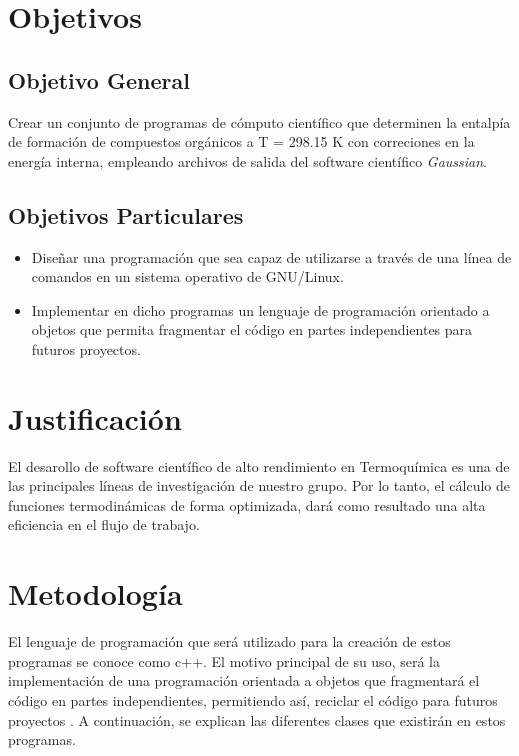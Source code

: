 \documentclass[12pt]{article}
\begin{document}
\section*{Objetivos}

\subsection*{Objetivo General}

Crear un conjunto de programas de cómputo científico que determinen la entalpía de formación de compuestos orgánicos a T = 298.15 K con correciones en la energía interna, empleando archivos de salida del software científico \textit{Gaussian}.

\subsection*{Objetivos Particulares}
\begin{itemize}
\item Diseñar una programación que sea capaz de utilizarse a través de una línea de comandos en un sistema operativo de GNU/Linux.

\item Implementar en dicho programas un lenguaje de programación orientado a objetos que permita fragmentar el código en partes independientes para futuros proyectos.
\end{itemize}

\section*{Justificación}
El desarollo de software científico de alto rendimiento en Termoquímica es una de las principales líneas de investigación de nuestro grupo. Por lo tanto, el cálculo de funciones termodinámicas de forma optimizada, dará como resultado una alta eficiencia en el flujo de trabajo. 


\section*{Metodología}
El lenguaje de programación que será utilizado para la creación de estos programas se conoce como c++. El motivo principal de su uso, será la implementación de una programación orientada a objetos que fragmentará el código en partes independientes, permitiendo así, reciclar el código para futuros proyectos \cite{cplusplus}. A continuación, se explican las diferentes clases que existirán en estos programas.
\end{document}
